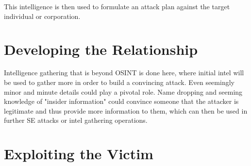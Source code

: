 This intelligence is then used to formulate an attack plan against the target individual or corporation.





\section{Developing the Relationship}
\begin{comment}
    
    - Engaging the target with the gathered info and fabricated pretext
    - Choosing the right timing
    - Practicing the engagement
    - Creating the strategy for engagement
    - Create a strategy, plan on how to exploit found weaknesses
    - Create a persona, a pretext with a convincing message
    - Choosing the right attack method
    - AI can help craft highly convincing messages, including the development of the persona (pretext)
    - Deepfake tech, chatbots etc
    - AI can analyze and predict the most suitable times and methods for an attack based on gathered intel

\end{comment}



Intelligence gathering that is beyond OSINT is done here, where initial intel will be used to gather more in order to build a convincing attack. Even seemingly minor and minute details could play a pivotal role. Name dropping and seeming knowledge of "insider information" could convince someone that the attacker is legitimate and thus provide more information to them, which can then be used in further SE attacks or intel gathering operations.

 





\section{Exploiting the Victim}
\begin{comment}
    
    - 

\end{comment}

